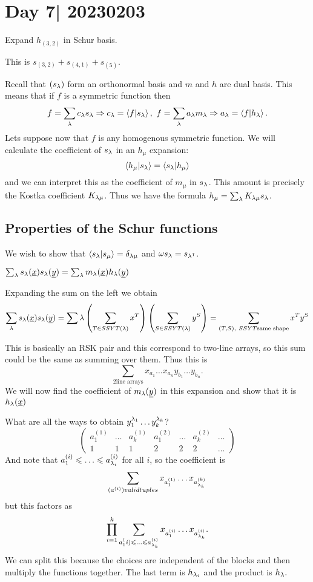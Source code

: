 \documentclass[12pt]{memoir}
\begin{document}
\section{Day 7| 20230203}

\begin{Ej}
    Expand $h_{(3,2)}$ in Schur basis.
\end{Ej}

\begin{ptcbr}
    This is $s_{(3,2)}+s_{(4,1)}+s_{(5)}$.
\end{ptcbr}

Recall that $(s_\lambda)$ form an orthonormal basis and $m$ and $h$ are dual basis. This means that if $f$ is a symmetric function then 
$$f=\sum_\lambda c_\lambda s_\lambda\Rightarrow c_\lambda=\braket{f}{s_\lambda},\ f=\sum_\lambda a_\lambda m_\lambda\Rightarrow a_\lambda=\braket{f}{h_\lambda}.$$
Lets suppose now that $f$ is any homogenous symmetric function. We will calculate the coefficient of $s_\lambda$ in an $h_\mu$ expansion:
$$\braket{h_\mu}{s_\lambda}=\braket{s_\lambda}{h_\mu}$$
and we can interpret this as the coefficient of $m_\mu$ in $s_\lambda$. This amount is precisely the Kostka coefficient $K_{\lambda\mu}$. Thus we have the formula $h_\mu=\sum_\lambda K_{\lambda\mu}s_\lambda$.

\subsection{Properties of the Schur functions}

We wish to show that $\braket{s_\lambda}{s_\mu}=\delta_{\lambda\mu}$ and $\omega s_\lambda=s_{\lambda^{\mathsf{T}}}$.

\begin{Prop}
    $\sum_\lambda s_\lambda(\underline{x})s_\lambda(\underline{y})=\sum_\lambda m_\lambda(\underline{x})h_\lambda(\underline{y})$
\end{Prop}

\begin{ptcbp}
    Expanding the sum on the left we obtain 
    $$\sum_\la s_\la(\un{x})s_\la(\un{y})=\sum\la\left(\sum_{T\in SSYT(\la)}x^T\right)\left(\sum_{S\in SSYT(\la)}y^S\right)=\sum_{(T,S),\ SSYT\text{same shape}}x^Ty^S$$

    This is basically an RSK pair and this correspond to two-line arrays, so this sum could be the same as summing over them. Thus this is  
    $$\sum_{2\text{line arrays}}x_{a_1}\dots x_{a_n}y_{b_1}\dots y_{b_n}.$$
We will now find the coefficient of $m_\lambda(\underline y)$ in this expansion and show that it is $h_\lambda(\underline x)$\par 
What are all the ways to obtain $y_1^{\lambda_1}\dots y_k^{\lambda_k}$?
$$\begin{pmatrix}
    a_1^{(1)}&\dots&a_k^{(1)}&a_1^{(2)}&\dots&a_k^{(2)}&\dots\\
    1&1&1&2&2&2&\dots
\end{pmatrix}$$
And note that $a_1^{(i)}\leq\dots\leq a_{\la_i}^{(i)}$ for all $i$, so the coefficient is 
$$\sum_{(a^{(i)}) valid tuples}x_{a_1^{(1)}}\dots x_{a_{\lambda_k}^{(k)}}$$
but this factors as 
$$\prod_{i=1}^k\sum_{a_1^(i)\leq\dots\leq a_{\la_k}^{(i)}}x_{a_1^{(i)}}\dots x_{a_{\la_k}^{(i)}}.$$
We can split this because the choices are independent of the blocks and then multiply the functions together. The last term is $h_{\lambda_i}$ and the product is $h_\lambda.$
\end{ptcbp}
\end{document}
